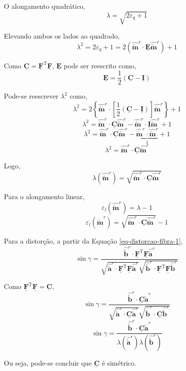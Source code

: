 O alongamento quadrático,
\[\lambda=\sqrt{2\varepsilon_q+1}\]

Elevando ambos os lados ao quadrado,
\[\lambda^2=2\varepsilon_q+1=2(\hat{\utilde{\mathbf{m}}}^r\cdot\underline{\mathbf{E}}\hat{\utilde{\mathbf{m}}}^r)+1\]

Como $\underline{\mathbf{C}}=\underline{\mathbf{F}}^{\text{T}}\underline{\mathbf{F}}$, $\underline{\mathbf{E}}$ pode ser reescrito como,
\begin{equation}\label{eq-green-lagrange-em-funcao-de-cauchy-green}
    \underline{\mathbf{E}}=\frac{1}{2}(\underline{\mathbf{C}}-\underline{\mathbf{I}})
\end{equation}

Pode-se reescrever $\lambda^2$ como,
\[\lambda^2=2\left\{\hat{\utilde{\mathbf{m}}}^r\cdot\left[\frac{1}{2}(\underline{\mathbf{C}}-\underline{\mathbf{I}})\right]\hat{\utilde{\mathbf{m}}}^r\right\}+1\]
\[\lambda^2=\hat{\utilde{\mathbf{m}}}^r\cdot\underline{\mathbf{C}}\hat{\utilde{\mathbf{m}}}^r-\hat{\utilde{\mathbf{m}}}^r\cdot\underline{\mathbf{I}}\hat{\utilde{\mathbf{m}}}^r+1\]
\[\lambda^2=\hat{\utilde{\mathbf{m}}}^r\cdot\underline{\mathbf{C}}\hat{\utilde{\mathbf{m}}}^r-\underbrace{\hat{\utilde{\mathbf{m}}}^r\cdot\hat{\utilde{\mathbf{m}}}^r}_{\displaystyle1}+1\]
\[\lambda^2=\hat{\utilde{\mathbf{m}}}^r\cdot\underline{\mathbf{C}}\hat{\utilde{\mathbf{m}}}^r\]

Logo,
\begin{equation}
    \lambda(\hat{\utilde{\mathbf{m}}}^r)=\sqrt{\hat{\utilde{\mathbf{m}}}^r\cdot\underline{\mathbf{C}}\hat{\utilde{\mathbf{m}}}^r}
\end{equation}

Para o alongamento linear,
\[\varepsilon_l(\hat{\utilde{\mathbf{m}}}^r)=\lambda-1\]
\begin{equation}\label{eq-alongamento-linear-1}
    \varepsilon_l(\hat{\utilde{\mathbf{m}}}^r)=\sqrt{\hat{\utilde{\mathbf{m}}}^r\cdot\underline{\mathbf{C}}\hat{\utilde{\mathbf{m}}}^r}-1
\end{equation}

Para a distorção, a partir da Equação \eqref{eq-distorcao-fibra-1},
\[\sin\gamma=\frac{\hat{\utilde{\mathbf{b}}}^r\cdot\underline{\mathbf{F}}^{\text{T}}\underline{\mathbf{F}}\hat{\utilde{\mathbf{a}}}^r}{\sqrt{\hat{\utilde{\mathbf{a}}}^r\cdot\underline{\mathbf{F}}^{\text{T}}\underline{\mathbf{F}}\hat{\utilde{\mathbf{a}}}^r}\sqrt{\hat{\utilde{\mathbf{b}}}^r\cdot\underline{\mathbf{F}}^{\text{T}}\underline{\mathbf{F}}\hat{\utilde{\mathbf{b}}}^r}}\]

Como $\underline{\mathbf{F}}^{\text{T}}\underline{\mathbf{F}}=\underline{\mathbf{C}}$,
\[\sin\gamma=\frac{\hat{\utilde{\mathbf{b}}}^r\cdot\underline{\mathbf{C}}\hat{\utilde{\mathbf{a}}}^r}{\displaystyle\sqrt{\hat{\utilde{\mathbf{a}}}^r\cdot\underline{\mathbf{C}}\hat{\utilde{\mathbf{a}}}^r}\sqrt{\hat{\utilde{\mathbf{b}}}^r\cdot\underline{\mathbf{C}}\hat{\utilde{\mathbf{b}}}^r}}\]
\[\sin\gamma=\frac{\hat{\utilde{\mathbf{b}}}^r\cdot\underline{\mathbf{C}}\hat{\utilde{\mathbf{a}}}^r}{\lambda(\hat{\utilde{\mathbf{a}}}^r)\lambda(\hat{\utilde{\mathbf{b}}}^r)}\]

Ou seja, pode-se concluir que $\underline{\mathbf{C}}$ é simétrico.